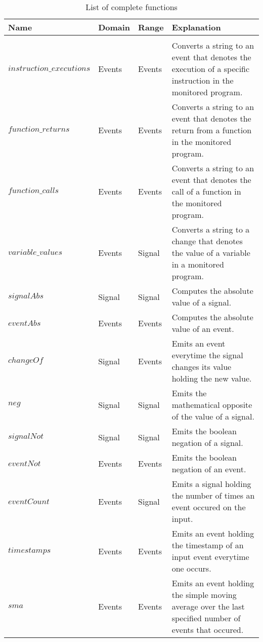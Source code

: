 \begin{table}[htb]
  \begin{tabularx}{\textwidth}{lllX}
    Name                                  & Domain  & Range   & Explanation \\
    \toprule \\
    \(\mathit{instruction\_executions}\)  & Events  & Events  & Converts a string to an event that denotes the execution of a specific instruction in the monitored program. \\
    \(\mathit{function\_returns}\)        & Events  & Events  & Converts a string to an event that denotes the return from a function in the monitored program. \\
    \(\mathit{function\_calls}\)          & Events  & Events  & Converts a string to an event that denotes the call of a function in the monitored program. \\
    \(\mathit{variable\_values}\)         & Events  & Signal  & Converts a string to a change that denotes the value of a variable in a monitored program. \\
    \(\mathit{signalAbs}\)                & Signal  & Signal  & Computes the absolute value of a signal. \\
    \(\mathit{eventAbs}\)                 & Events  & Events  & Computes the absolute value of an event. \\
    \(\mathit{changeOf}\)                 & Signal  & Events  & Emits an event everytime the signal changes its value holding the new value. \\
    \(\mathit{neg}\)                      & Signal  & Signal  & Emits the mathematical opposite of the value of a signal. \\
    \(\mathit{signalNot}\)                & Signal  & Signal  & Emits the boolean negation of a signal. \\
    \(\mathit{eventNot}\)                 & Events  & Events  & Emits the boolean negation of an event. \\
    \(\mathit{eventCount}\)               & Events  & Signal  & Emits a signal holding the number of times an event occured on the input. \\
    \(\mathit{timestamps}\)               & Events  & Events  & Emits an event holding the timestamp of an input event everytime one occurs. \\
    \(\mathit{sma}\)                      & Events  & Events  & Emits an event holding the simple moving average over the last specified number of events that occured. \\
  \end{tabularx}
\caption{List of complete functions}
\label{table:complete_functions}
\end{table}

